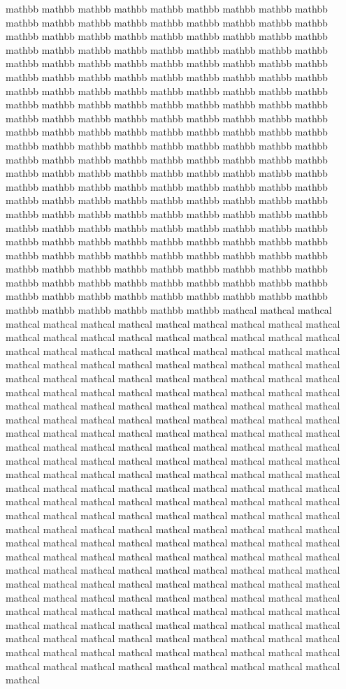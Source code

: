 mathbb mathbb mathbb mathbb mathbb mathbb mathbb mathbb mathbb mathbb mathbb mathbb mathbb mathbb mathbb mathbb mathbb mathbb mathbb mathbb mathbb mathbb mathbb mathbb mathbb mathbb mathbb mathbb mathbb mathbb mathbb mathbb mathbb mathbb mathbb mathbb mathbb mathbb mathbb mathbb mathbb mathbb mathbb mathbb mathbb mathbb mathbb mathbb mathbb mathbb mathbb mathbb mathbb mathbb mathbb mathbb mathbb mathbb mathbb mathbb mathbb mathbb mathbb mathbb mathbb mathbb mathbb mathbb mathbb mathbb mathbb mathbb mathbb mathbb mathbb mathbb mathbb mathbb mathbb mathbb mathbb mathbb mathbb mathbb mathbb mathbb mathbb mathbb mathbb mathbb mathbb mathbb mathbb mathbb mathbb mathbb mathbb mathbb mathbb mathbb mathbb mathbb mathbb mathbb mathbb mathbb mathbb mathbb mathbb mathbb mathbb mathbb mathbb mathbb mathbb mathbb mathbb mathbb mathbb mathbb mathbb mathbb mathbb mathbb mathbb mathbb mathbb mathbb mathbb mathbb mathbb mathbb mathbb mathbb mathbb mathbb mathbb mathbb mathbb mathbb mathbb mathbb mathbb mathbb mathbb mathbb mathbb mathbb mathbb mathbb mathbb mathbb mathbb mathbb mathbb mathbb mathbb mathbb mathbb mathbb mathbb mathbb mathbb mathbb mathbb mathbb mathbb mathbb mathbb mathbb mathbb mathbb mathbb mathbb mathbb mathbb mathbb mathbb mathbb mathbb mathbb mathbb mathbb mathbb mathbb mathbb mathbb mathbb mathbb mathbb mathbb mathbb mathbb mathbb mathbb mathbb mathbb mathbb mathbb mathbb mathbb mathbb mathbb mathbb mathcal mathcal mathcal mathcal mathcal mathcal mathcal mathcal mathcal mathcal mathcal mathcal mathcal mathcal mathcal mathcal mathcal mathcal mathcal mathcal mathcal mathcal mathcal mathcal mathcal mathcal mathcal mathcal mathcal mathcal mathcal mathcal mathcal mathcal mathcal mathcal mathcal mathcal mathcal mathcal mathcal mathcal mathcal mathcal mathcal mathcal mathcal mathcal mathcal mathcal mathcal mathcal mathcal mathcal mathcal mathcal mathcal mathcal mathcal mathcal mathcal mathcal mathcal mathcal mathcal mathcal mathcal mathcal mathcal mathcal mathcal mathcal mathcal mathcal mathcal mathcal mathcal mathcal mathcal mathcal mathcal mathcal mathcal mathcal mathcal mathcal mathcal mathcal mathcal mathcal mathcal mathcal mathcal mathcal mathcal mathcal mathcal mathcal mathcal mathcal mathcal mathcal mathcal mathcal mathcal mathcal mathcal mathcal mathcal mathcal mathcal mathcal mathcal mathcal mathcal mathcal mathcal mathcal mathcal mathcal mathcal mathcal mathcal mathcal mathcal mathcal mathcal mathcal mathcal mathcal mathcal mathcal mathcal mathcal mathcal mathcal mathcal mathcal mathcal mathcal mathcal mathcal mathcal mathcal mathcal mathcal mathcal mathcal mathcal mathcal mathcal mathcal mathcal mathcal mathcal mathcal mathcal mathcal mathcal mathcal mathcal mathcal mathcal mathcal mathcal mathcal mathcal mathcal mathcal mathcal mathcal mathcal mathcal mathcal mathcal mathcal mathcal mathcal mathcal mathcal mathcal mathcal mathcal mathcal mathcal mathcal mathcal mathcal mathcal mathcal mathcal mathcal mathcal mathcal mathcal mathcal mathcal mathcal mathcal mathcal mathcal mathcal mathcal mathcal mathcal mathcal mathcal mathcal mathcal mathcal mathcal mathcal mathcal mathcal mathcal mathcal mathcal mathcal mathcal mathcal mathcal mathcal mathcal mathcal mathcal mathcal mathcal mathcal mathcal mathcal mathcal mathcal mathcal mathcal mathcal mathcal mathcal mathcal 
